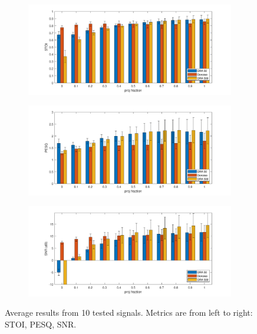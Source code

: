 \documentclass[conference]{IEEEtran}
\begin{document}
\begin{figure}[t]
	\begin{subfigure}{.33\textwidth}
		\centering
		\includegraphics[width=1.1\linewidth]{figures/lam1_stoi}  
	\end{subfigure}
	\begin{subfigure}{.33\textwidth}
		\centering
		\includegraphics[width=1.1\linewidth]{figures/lam1_PESQ}  
	\end{subfigure}
	\begin{subfigure}{.33\textwidth}
		\centering
		\includegraphics[width=1.1\linewidth]{figures/lam1_SNR}  
	\end{subfigure}
	\caption{Average results from 10 tested signals. Metrics are from left to right: STOI, PESQ, SNR.
		}
	\label{fig:final3witherrors}
\end{figure}
\end{document}
